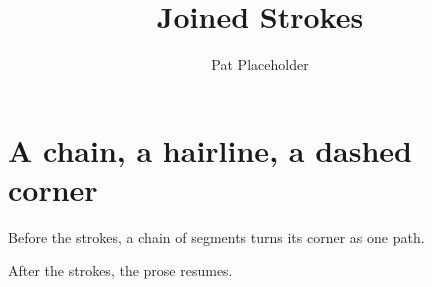 \documentclass{article}
\title{Joined Strokes}
\author{Pat Placeholder}
\begin{document}
\maketitle

\section{A chain, a hairline, a dashed corner}

Before the strokes, a chain of segments turns its corner as one path.

\begin{center}
\end{center}

After the strokes, the prose resumes.
\end{document}
